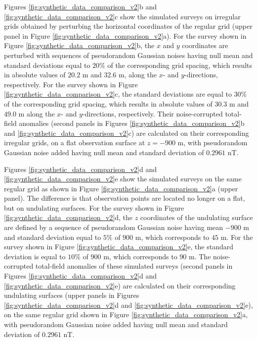 \documentclass[manuscript]{geophysics}
\begin{document}

Figures \ref{fig:synthetic_data_comparison_v2}b and \ref{fig:synthetic_data_comparison_v2}c 
show the simulated surveys on irregular grids obtained by perturbing the horizontal coordinates
of the regular grid (upper panel in Figure \ref{fig:synthetic_data_comparison_v2}a).
For the survey shown in Figure \ref{fig:synthetic_data_comparison_v2}b, the $x$ and $y$ coordinates 
are perturbed with sequences of pseudorandom Gaussian noises having null mean and standard deviations
equal to $20\%$ of the corresponding grid spacing, which results in
absolute values of $20.2$ m and $32.6$ m, along the $x$- and $y$-directions, respectively.
For the survey shown in Figure \ref{fig:synthetic_data_comparison_v2}c, the standard deviations
are equal to $30\%$ of the corresponding grid spacing, which results in absolute values of 
$30.3$ m and $49.0$ m along the $x$- and $y$-directions, respectively.
Their noise-corrupted total-field anomalies (second panels in Figures 
\ref{fig:synthetic_data_comparison_v2}b and \ref{fig:synthetic_data_comparison_v2}c) are calculated 
on their corresponding irregular grids, on a flat observation surface at $z = -900$ m, 
with pseudorandom Gaussian noise added having null mean and standard deviation of $0.2961$ nT.


Figures \ref{fig:synthetic_data_comparison_v2}d and \ref{fig:synthetic_data_comparison_v2}e 
show the simulated surveys on the same regular grid as shown in Figure 
\ref{fig:synthetic_data_comparison_v2}a (upper panel). The difference is that observation points
are located no longer on a flat, but on undulating surfaces.
For the survey shown in Figure \ref{fig:synthetic_data_comparison_v2}d, the $z$ coordinates 
of the undulating surface are defined by a sequence of pseudorandom Gaussian noise having mean 
$-900$ m and standard deviation equal to $5\%$ of $900$ m, which corresponds to $45$ m.
For the survey shown in Figure \ref{fig:synthetic_data_comparison_v2}e, the standard deviation 
is equal to $10\%$ of $900$ m, which corresponds to $90$ m.
The noise-corrupted total-field anomalies of these simulated surveys (second panels in Figures 
\ref{fig:synthetic_data_comparison_v2}d and \ref{fig:synthetic_data_comparison_v2}e) are calculated 
on their corresponding undulating surfaces (upper panels in Figures 
\ref{fig:synthetic_data_comparison_v2}d and \ref{fig:synthetic_data_comparison_v2}e),
on the same regular grid shown in Figure \ref{fig:synthetic_data_comparison_v2}a,
with pseudorandom Gaussian noise added having null mean and standard deviation of $0.2961$ nT.
\end{document}
